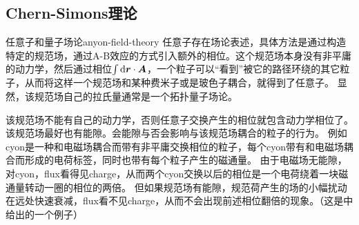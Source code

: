\subsection{Chern-Simons理论}

\begin{back}{任意子和量子场论}{anyon-field-theory}
    任意子存在场论表述，具体方法是通过构造特定的规范场，通过A-B效应的方式引入额外的相位。这个规范场本身没有非平庸的动力学，然后通过相位$\int \dd{\vb*{r}} \cdot \vb*{A}$，一个粒子可以“看到”被它的路径环绕的其它粒子，从而将这样一个规范场和某种费米子或是玻色子耦合，就得到了任意子。
    显然，该规范场自己的拉氏量通常是一个拓扑量子场论。

    该规范场不能有自己的动力学，否则任意子交换产生的相位就包含动力学相位了。
    该规范场最好也有能隙。会能隙与否会影响与该规范场耦合的粒子的行为。
    例如cyon是一种和电磁场耦合而带有非平庸交换相位的粒子，每个cyon带有和电磁场耦合而形成的电荷标签，同时也带有每个粒子产生的磁通量。
    由于电磁场无能隙，对cyon，flux看得见charge，从而两个cyon交换以后的相位是一个电荷绕着一块磁通量转动一圈的相位的两倍。
    但如果规范场有能隙，规范荷产生的场的小幅扰动在远处快速衰减，flux看不见charge，从而不会出现前述相位翻倍的现象。（这是\cite{viefers_anyons}中给出的一个例子）
\end{back}



